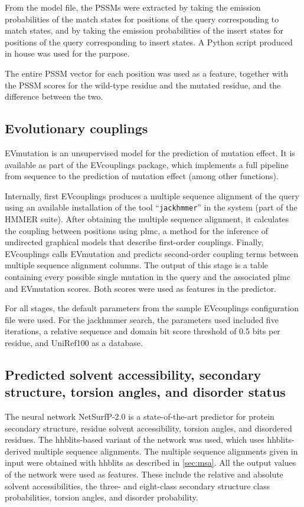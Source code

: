 From the model file, the PSSMs were extracted by taking the emission probabilities of the match states for positions of the query corresponding to match states, and by taking the emission probabilities of the insert states for positions of the query corresponding to insert states.
A Python script produced in house was used for the purpose.

The entire PSSM vector for each position was used as a feature, together with the PSSM scores for the wild-type residue and the mutated residue, and the difference between the two.

\subsection{Evolutionary couplings}\label{sec:ev_mutation}
EVmutation is an unsupervised model for the prediction of mutation effect.
It is available as part of the EVcouplings package, which implements a full pipeline from sequence to the prediction of mutation effect (among other functions).

Internally, first EVcouplings produces a multiple sequence alignment of the query using an available installation of the tool ``\texttt{jackhmmer}'' in the system (part of the HMMER suite).
After obtaining the multiple sequence alignment, it calculates the coupling between positions using plmc, a method for the inference of undirected graphical models that describe first-order couplings.
Finally, EVcouplings calls EVmutation and predicts second-order coupling terms between multiple sequence alignment columns.
The output of this stage is a table containing every possible single mutation in the query and the associated plmc and EVmutation scores.
Both scores were used as features in the predictor.

For all stages, the default parameters from the sample EVcouplings configuration file were used.
For the jackhmmer search, the parameters used included five iterations, a relative sequence and domain bit score threshold of 0.5 bits per residue, and UniRef100 as a database.

\subsection{Predicted solvent accessibility, secondary structure, torsion angles, and disorder status}
The neural network NetSurfP-2.0 is a state-of-the-art predictor for protein secondary structure, residue solvent accessibility, torsion angles, and disordered residues.
The hhblits-based variant of the network was used, which uses hhblits-derived multiple sequence alignments.
The multiple sequence alignments given in input were obtained with hhblits as described in \cref{sec:msa}.
All the output values of the network were used as features.
These include the relative and absolute solvent accessibilities, the three- and eight-class secondary structure class probabilities, torsion angles, and disorder probability.

